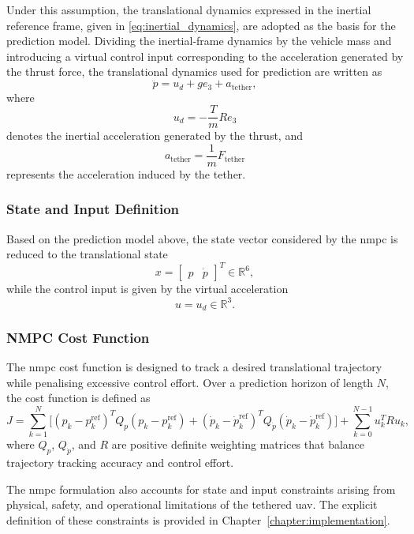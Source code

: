 Under this assumption, the translational dynamics expressed in the inertial reference frame, given in \eqref{eq:inertial_dynamics}, are adopted as the basis for the prediction model. Dividing the inertial-frame dynamics by the vehicle mass and introducing a virtual control input corresponding to the acceleration generated by the thrust force, the translational dynamics used for prediction are written as
\begin{equation}
\ddot{p} = u_d + g e_3 + a_{\text{tether}},
\end{equation}
where
\begin{equation}
u_d = -\frac{T}{m} R e_3
\end{equation}
denotes the inertial acceleration generated by the thrust, and
\begin{equation}
a_{\text{tether}} = \frac{1}{m} F_{\text{tether}}
\end{equation}
represents the acceleration induced by the tether.


\subsubsection{State and Input Definition}

Based on the prediction model above, the state vector considered by the \gls{nmpc} is reduced to the translational state
\begin{equation}
x =
\begin{bmatrix}
p &
\dot{p}
\end{bmatrix}^T \in \mathbb{R}^6,
\end{equation}
while the control input is given by the virtual acceleration
\begin{equation}
u = u_d \in \mathbb{R}^3.
\end{equation}


\subsubsection{NMPC Cost Function}

The \gls{nmpc} cost function is designed to track a desired translational trajectory while penalising excessive control effort. Over a prediction horizon of length \(N\), the cost function is defined as
\begin{equation}
J =
\sum_{k=1}^{N}
\Big[
(p_k - p_k^{\text{ref}})^T Q_p (p_k - p_k^{\text{ref}})
+
(\dot{p}_k - \dot{p}_k^{\text{ref}})^T Q_{\dot{p}} (\dot{p}_k - \dot{p}_k^{\text{ref}})
\Big]
+
\sum_{k=0}^{N-1}
u_k^T R u_k,
\end{equation}
where \(Q_p\), \(Q_{\dot{p}}\), and \(R\) are positive definite weighting matrices that balance trajectory tracking accuracy and control effort.

The \gls{nmpc} formulation also accounts for state and input constraints arising from physical, safety, and operational limitations of the tethered \gls{uav}. The explicit definition of these constraints is provided in Chapter~\ref{chapter:implementation}.
